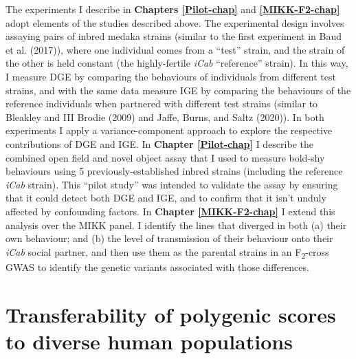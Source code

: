 \documentclass[
]{book}
\begin{document}
The experiments I describe in \textbf{Chapters \ref{Pilot-chap}} and \textbf{\ref{MIKK-F2-chap}} adopt elements of the studies described above. The experimental design involves assaying pairs of inbred medaka strains (similar to the first experiment in Baud et al. (2017)), where one individual comes from a ``test'' strain, and the strain of the other is held constant (the highly-fertile \emph{iCab} ``reference'' strain). In this way, I measure DGE by comparing the behaviours of individuals from different test strains, and with the same data measure IGE by comparing the behaviours of the reference individuals when partnered with different test strains (similar to Bleakley and III Brodie (2009) and Jaffe, Burns, and Saltz (2020)). In both experiments I apply a variance-component approach to explore the respective contributions of DGE and IGE. In \textbf{Chapter \ref{Pilot-chap}} I describe the combined open field and novel object assay that I used to measure bold-shy behaviours using 5 previously-established inbred strains (including the reference \emph{iCab} strain). This ``pilot study'' was intended to validate the assay by ensuring that it could detect both DGE and IGE, and to confirm that it isn't unduly affected by confounding factors. In \textbf{Chapter \ref{MIKK-F2-chap}} I extend this analysis over the MIKK panel. I identify the lines that diverged in both (a) their own behaviour; and (b) the level of transmission of their behaviour onto their \emph{\textcolor{iCab_424B4D}{iCab}} social partner, and then use them as the parental strains in an F\textsubscript{2}-cross GWAS to identify the genetic variants associated with those differences.

\hypertarget{Fst-intro}{%
\section{Transferability of polygenic scores to diverse human populations}\label{Fst-intro}}
\end{document}
